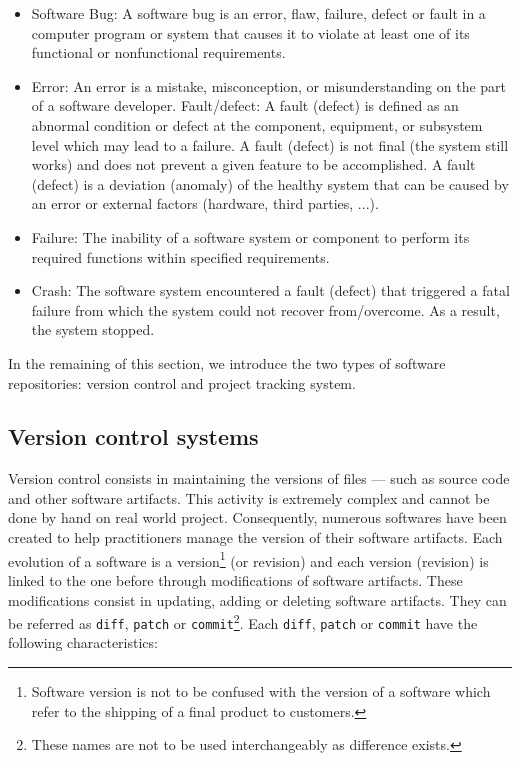 \begin{itemize}
	\item Software Bug: A software bug is an error, flaw, failure, defect or fault in a computer program or system that causes it to violate at least one of its functional or nonfunctional requirements.
	\item Error: An error is a mistake, misconception, or misunderstanding on the part of a software developer.
	Fault/defect: A fault (defect) is defined as an abnormal condition or defect at the component, equipment, or subsystem level which may lead to a failure. A fault (defect) is not final (the system still works) and does not prevent a given feature to be accomplished.  A fault (defect) is a deviation (anomaly) of the healthy system that can be caused by an error or external factors (hardware, third parties, ...).
	\item Failure: The inability of a software system or component to perform its required functions within specified requirements.
	\item Crash: The software system encountered a fault (defect) that triggered a fatal failure from which the system could not recover from/overcome. As a result,  the system stopped.
\end{itemize}

In the remaining of this section, we introduce the two types of software repositories: version control and project tracking system.

\subsection{Version control systems\label{sec:version-control}}

Version control consists in maintaining the versions of files --- such as source code and other software artifacts.
This activity is extremely complex and cannot be done by hand on real world project.
Consequently, numerous softwares have been created to help practitioners manage the version of their software artifacts.
Each evolution of a software is a version\footnote{Software version is not to be confused with the version of a software which refer to the shipping of a final product to customers.} (or revision) and each version (revision) is linked to the one before through modifications of software artifacts.
These modifications consist in updating, adding or deleting software artifacts.
They can be referred as \texttt{diff}, {\tt patch} or {\tt commit}\footnote{These names are not to be used interchangeably as difference exists.}.
Each \texttt{diff}, {\tt patch} or {\tt commit} have the following characteristics:

